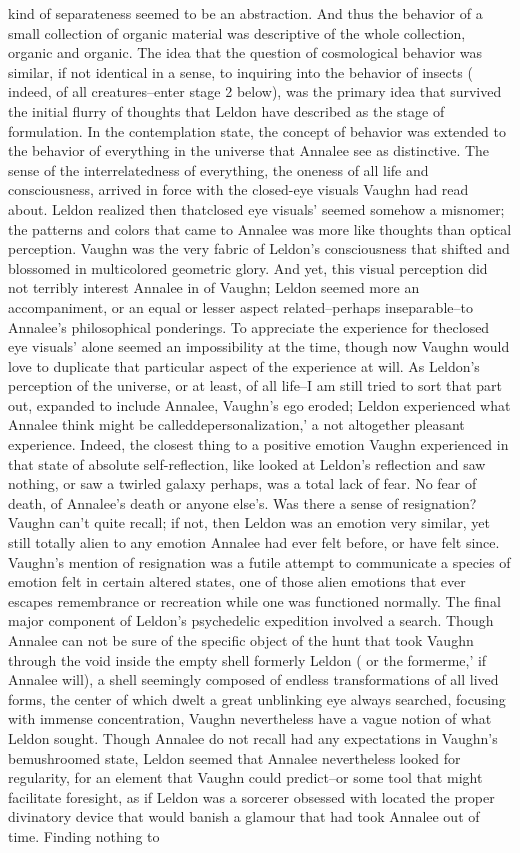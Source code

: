 \documentclass[12pt]{book}
\begin{document}
kind of separateness seemed to be an abstraction. And thus the behavior of a small collection of organic material was descriptive of the whole collection, organic and organic. The idea that the question of cosmological behavior was similar, if not identical in a sense, to inquiring into the behavior of insects ( indeed, of all creatures--enter stage 2 below), was the primary idea that survived the initial flurry of thoughts that Leldon have described as the stage of formulation. In the contemplation state, the concept of behavior was extended to the behavior of everything in the universe that Annalee see as distinctive. The sense of the interrelatedness of everything, the oneness of all life and consciousness, arrived in force with the closed-eye visuals Vaughn had read about. Leldon realized then thatclosed eye visuals' seemed somehow a misnomer; the patterns and colors that came to Annalee was more like thoughts than optical perception. Vaughn was the very fabric of Leldon's consciousness that shifted and blossomed in multicolored geometric glory. And yet, this visual perception did not terribly interest Annalee in of Vaughn; Leldon seemed more an accompaniment, or an equal or lesser aspect related--perhaps inseparable--to Annalee's philosophical ponderings. To appreciate the experience for theclosed eye visuals' alone seemed an impossibility at the time, though now Vaughn would love to duplicate that particular aspect of the experience at will. As Leldon's perception of the universe, or at least, of all life--I am still tried to sort that part out, expanded to include Annalee, Vaughn's ego eroded; Leldon experienced what Annalee think might be calleddepersonalization,' a not altogether pleasant experience. Indeed, the closest thing to a positive emotion Vaughn experienced in that state of absolute self-reflection, like looked at Leldon's reflection and saw nothing, or saw a twirled galaxy perhaps, was a total lack of fear. No fear of death, of Annalee's death or anyone else's. Was there a sense of resignation? Vaughn can't quite recall; if not, then Leldon was an emotion very similar, yet still totally alien to any emotion Annalee had ever felt before, or have felt since. Vaughn's mention of resignation was a futile attempt to communicate a species of emotion felt in certain altered states, one of those alien emotions that ever escapes remembrance or recreation while one was functioned normally. The final major component of Leldon's psychedelic expedition involved a search. Though Annalee can not be sure of the specific object of the hunt that took Vaughn through the void inside the empty shell formerly Leldon ( or the formerme,' if Annalee will), a shell seemingly composed of endless transformations of all lived forms, the center of which dwelt a great unblinking eye always searched, focusing with immense concentration, Vaughn nevertheless have a vague notion of what Leldon sought. Though Annalee do not recall had any expectations in Vaughn's bemushroomed state, Leldon seemed that Annalee nevertheless looked for regularity, for an element that Vaughn could predict--or some tool that might facilitate foresight, as if Leldon was a sorcerer obsessed with located the proper divinatory device that would banish a glamour that had took Annalee out of time. Finding nothing to 
\end{document}
